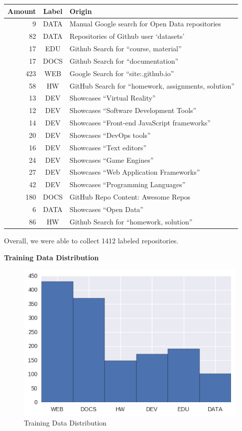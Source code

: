 \documentclass{article}
\begin{document}
\begin{longtable}[]{@{}rcl@{}}
\toprule
Amount & Label & Origin\tabularnewline
\midrule
\endhead
9 & DATA & Manual Google search for Open Data
repositories\tabularnewline
82 & DATA & Repositories of Github user `datasets'\tabularnewline
17 & EDU & Github Search for ``course, material''\tabularnewline
17 & DOCS & Github Search for ``documentation''\tabularnewline
423 & WEB & Google Search for ``site:.github.io''\tabularnewline
58 & HW & GitHub Search for ``homework, assignments,
solution''\tabularnewline
13 & DEV & Showcases ``Virtual Reality''\tabularnewline
12 & DEV & Showcases ``Software Development Tools''\tabularnewline
14 & DEV & Showcases ``Front-end JavaScript frameworks''\tabularnewline
20 & DEV & Showcases ``DevOps tools''\tabularnewline
16 & DEV & Showcases ``Text editors''\tabularnewline
24 & DEV & Showcases ``Game Engines''\tabularnewline
27 & DEV & Showcases ``Web Application Frameworks''\tabularnewline
42 & DEV & Showcases ``Programming Languages''\tabularnewline
180 & DOCS & GitHub Repo Content: Awesome Repos\tabularnewline
6 & DATA & Showcases ``Open Data''\tabularnewline
86 & HW & Github Search for ``homework, solution''\tabularnewline
\bottomrule
\end{longtable}

Overall, we were able to collect 1412 labeled repositories.

\textbf{Training Data Distribution}

\begin{figure}
\centering
\includegraphics{graphics/training_data_distribution.png}
\caption{Training Data Distribution}
\end{figure}
\end{document}
